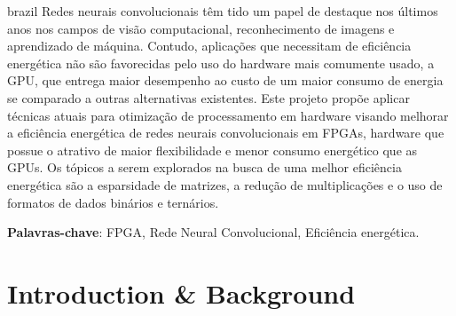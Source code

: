 \documentclass[
    12pt,                       %
    oneside,                    %
    a4paper,                    %
    brazil,                     %
    french,                     %
    spanish,                    %
    english,                    %
    ]{abntex2}
\begin{document}
\setlength{\absparsep}{18pt} %
\begin{resumo}[Resumo]
  \begin{otherlanguage*}{brazil}
    Redes neurais convolucionais têm tido um papel de destaque nos últimos anos nos campos de visão computacional, reconhecimento de imagens e aprendizado de máquina.
    Contudo, aplicações que necessitam de eficiência energética não são favorecidas pelo uso do hardware mais comumente usado, a GPU, que entrega maior desempenho ao custo de um maior consumo de energia se comparado a outras alternativas existentes.
    Este projeto propõe aplicar técnicas atuais para otimização de processamento em hardware visando melhorar a eficiência energética de redes neurais convolucionais em FPGAs, hardware que possue o atrativo de maior flexibilidade e menor consumo energético que as GPUs.
    Os tópicos a serem explorados na busca de uma melhor eficiência energética são a esparsidade de matrizes, a redução de multiplicações e o uso de formatos de dados binários e ternários.

 \textbf{Palavras-chave}: FPGA, Rede Neural Convolucional, Eficiência energética.
  \end{otherlanguage*}
\end{resumo}

\tableofcontents*
\cleardoublepage


\textual


\chapter[Introduction \& Background]{Introduction \& Background}
\end{document}
